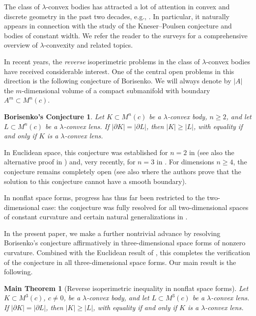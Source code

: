 \documentclass[12pt]{amsart}
\renewcommand{\ge}{\geqslant}
\theoremstyle{theorem}
\newtheorem*{main}{Main Theorem}
\newtheorem*{BorisenkoConj}{Borisenko's Conjecture}
\theoremstyle{Intro}
\theoremstyle{definition}
\theoremstyle{remark}
\theoremstyle{claim}
\numberwithin{equation}{section}
\begin{document}
The class of $\lambda$-convex bodies has attracted a lot of attention in convex and discrete geometry in the past two decades, e.g.,  \cite{AAF, AACF, Bezdek2008, Bezdek2012, FRS, JMR, SWY}. In particular, it naturally appears in connection with the study of the Kneser--Poulsen conjecture and bodies of constant width. We refer the reader to the surveys \cite{BLN, BLNP} for a comprehensive overview of $\lambda$-convexity and related topics.

In recent years, the \emph{reverse} isoperimetric problems in the class of $\lambda$-convex bodies have received considerable interest. One of the central open problems in this direction is the following conjecture of Borisenko. We will always denote by $|A|$ the $m$-dimensional volume of a compact submanifold with boundary $A^m\subset M^n(c)$.

\begin{BorisenkoConj}
Let $K \subset M^n(c)$ be a $\lambda$-convex body, $n \ge 2$, and let $L \subset M^n(c)$ be a $\lambda$-convex \emph{lens}. If $|\partial K| = |\partial L|$, then $|K| \ge |L|$, with equality if and only if $K$ is a $\lambda$-convex lens.
\end{BorisenkoConj}

In Euclidean space, this conjecture was established for $n=2$ in \cite{BorDr14} (see also the alternative proof in \cite{FKV}) and, very recently, for $n=3$ in \cite{DT}. For dimensions $n \ge 4$, the conjecture remains completely open (see also \cite{Julian} where the authors prove that the solution to this conjecture cannot have a smooth boundary).

In nonflat space forms, progress has thus far been restricted to the two-dimensional case: the conjecture was fully resolved for all two-dimensional spaces of constant curvature and certain natural generalizations in \cite{BorDr15_1, DrLob, BorNA}.

In the present paper, we make a further nontrivial advance by resolving Borisenko’s conjecture affirmatively in three-dimensional space forms of nonzero curvature. Combined with the Euclidean result of \cite{DT}, this completes the verification of the conjecture in all three-dimensional space forms. Our main result is the following.

\begin{main}[Reverse isoperimetric inequality in nonflat space forms]
\label{Thm:Main1}
Let $K \subset M^3(c)$, $c \neq 0$, be a $\lambda$-convex body, and let $L \subset M^3(c)$ be a $\lambda$-convex lens. If $|\partial K| = |\partial L|$, then $|K| \ge |L|$, with equality if and only if $K$ is a $\lambda$-convex lens.
\end{main}
\end{document}

